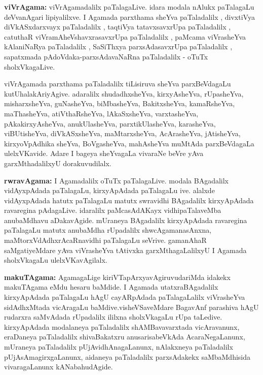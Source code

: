 \vskip 2pt

\textbf{viVrAgama:} viVrAgamadalilx  paTalagaLive. idara modala nAlukx paTalagaLu deVvanAgari lipiyalilxve. I Agamada parxthama sheYva paTaladalilx , divxtiVya diVkASxdarxvayx paTaladalilx , taqtiVya tatavxsavxrUpa paTaladalilx , catuthaR viVramAheVshavxrasavxrUpa paTaladalilx , paMcama viVrasheYva kAlaniNaRya paTaladalilx , SaSiThxya parxsAdasavxrUpa paTaladalilx , sapatxmada pAdoVdaka-parxsAdavaNaRna paTaladalilx - oTuTx  sholxVkagaLive.

\vskip 2pt

viVrAgamada parxthama paTaladalilx tiLisiruva sheYva parxBeVdagaLu kutUhalakAriyAgive. adaralilx shudadhxsheYva, kirxyAsheYva, rUpasheYva, misharxsheYva, guNasheYva, biMbasheYva, BakitxsheYva, kamaRsheYva, maThasheYva, atiVthaRsheYva, lAkaSxsheYva, varxtasheYva, pAkakirxyAsheYva, anukUlasheYva, parxtikUlasheYva, karasheYva, viBUtisheYva, diVkASxsheYva, maMtarxsheYva, AcArasheYva, jAtisheYva, kirxyoVpAdhika sheYva, BoVgasheYva, mahAsheYva muMtAda parxBeVdagaLa ulelxVKavide. Adare I bageya sheYvagaLa vivaraNe beVre yAva garxMthadalilxyU dorakuvudilalx.

\vskip 2pt

\textbf{rwravAgama:} I Agamadalilx oTuTx  paTalagaLive. modala BAgadalilx vidAyxpAdada  paTalagaLu, kirxyApAdada  paTalagaLu ive. alalxde vidAyxpAdada hatutx paTalagaLu matutx swravidhi BAgadalilx kirxyApAdada  ravaregina pAdagaLive. idaralilx paMcasAdAKayx vidhipaTalaveMba anubaMdhavu aDakavAgide. mUraneya BAgadalilx kirxyApAdada  ravaregina paTalagaLu matutx anubaMdha rUpadalilx shwcAgamanasAnxna, maMtorxVdAdhxrAcaRnavidhi paTalagaLu seVrive. gamanAhaR saMgatiyeMdare yAva viVrasheYva tAtivxka garxMthagaLalilxyU I Agamada sholxVkagaLu ulelxVKavAgilalx.

\vskip 2pt

\textbf{makuTAgama:} AgamagaLige kiriVTapArxyavAgiruvudariMda idakekx makuTAgama eMdu hesaru baMdide. I Agamada utatxraBAgadalilx kirxyApAdada  paTalagaLu hAgU cayARpAdada  paTalagaLalilx viVrasheYva sidAdhxMtada vicAragaLu baMdive.\break visheVSaveMdare BagavAnf parashiva hAgU rudarxra saMvAdada rUpadalilx ililxna sholxVkagaLu rUpa taLedive. kirxyApAdada modala\-neya paTaladalilx shAMBavavarxtada vicAravanunx, eraDaneya paTaladalilx shivaBakatxru anusarisabeVkAda AcaraNegaLanunx, mUraneya paTaladalilx pUjAvidhAnagaLanunx, nAlakxneya paTaladalilx pUjAsAmagirxgaLanunx, aidaneya paTaladalilx parxsAdakekx saMbaMdhisida vivara\-gaLanunx kANabahudAgide.

